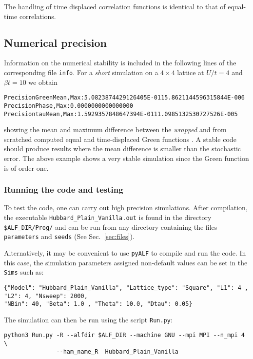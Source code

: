 The handling of time displaced correlation functions is identical to that of equal-time correlations. 

\subsection{Numerical precision}\label{sec:prec_spin}

Information on the numerical stability is included in the following lines of the corresponding file \texttt{info}. 
For a   \textit{short} simulation on a $4 \times 4$  lattice at $U/t=4$ and $\beta t = 10$  we obtain
 \begin{alltt}
Precision Green  Mean, Max :    5.0823874429126405E-011   5.8621144596315844E-006
Precision Phase, Max       :    0.0000000000000000     
Precision tau    Mean, Max :    1.5929357848647394E-011   1.0985132530727526E-005 
\end{alltt}
showing the mean and maximum difference between the \textit{wrapped}  and from scratched computed equal and time-displaced  Green functions \cite{Assaad08_rev}.
A stable code  should produce results where the mean difference is smaller than the  stochastic error. The above example  shows a very stable simulation since the Green function  is of order one. 

\subsubsection{Running the code and testing}

To test the code, one can carry out high precision simulations. After compilation, the executable \texttt{Hubbard\_Plain\_Vanilla.out} is found in the directory \texttt{\$ALF\_DIR/Prog/} and can be run from any directory containing the files \texttt{parameters} and \texttt{seeds} (See Sec.~\ref{sec:files}).

Alternatively, it may be convenient to use \texttt{pyALF} to compile and run the code. In this case, the simulation parameters assigned non-default values can be set in the \texttt{Sims} such as: 
\begin{lstlisting}[style=fortran]
{"Model": "Hubbard_Plain_Vanilla", "Lattice_type": "Square", "L1": 4 , "L2": 4, "Nsweep": 2000,  
"NBin": 40, "Beta": 1.0 , "Theta": 10.0, "Dtau": 0.05}
\end{lstlisting}
The simulation can then be run using the script \texttt{Run.py}:
\begin{lstlisting}[style=bash]
python3 Run.py -R --alfdir $ALF_DIR --machine GNU --mpi MPI --n_mpi 4 \
               --ham_name_R  Hubbard_Plain_Vanilla
\end{lstlisting}

